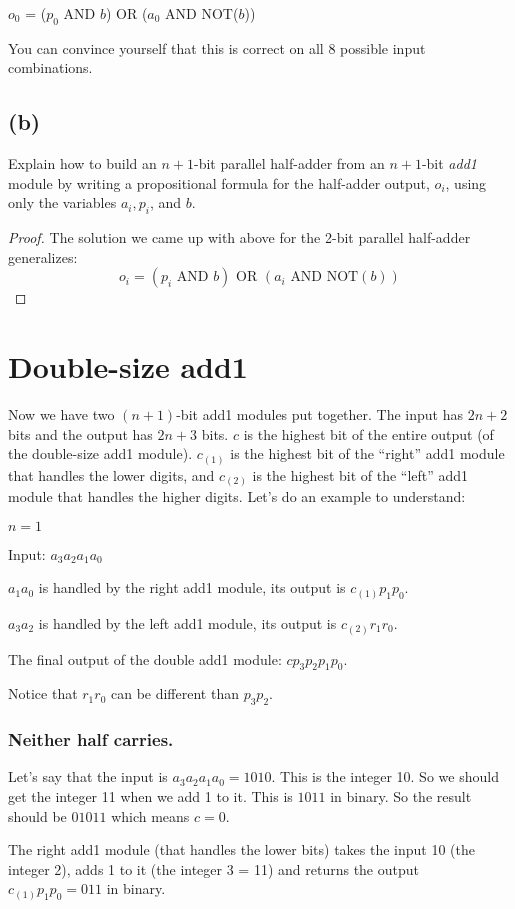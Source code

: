 \documentclass[14pt]{extarticle}
\begin{document}
$o_0$ = ($p_0$ AND $b$) OR ($a_0$ AND NOT($b$))

You can convince yourself that this is correct on all 8 possible input combinations.

\subsection{(b)}
Explain how to build an $n+1$-bit parallel half-adder from an $n+1$-bit \textit{add1} module by writing a propositional formula for the half-adder output, $o_i$, using only the variables $a_i, p_i$, and $b$.
\begin{proof}
The solution we came up with above for the 2-bit parallel half-adder generalizes:
$$
o_i = (p_i \text{ AND } b) \text{ OR } (a_i \text{ AND NOT}(b))
$$
\end{proof}
\section{Double-size add1}
Now we have two $(n+1)$-bit add1 modules put together. The input has $2n+2$ bits and the output has $2n+3$ bits. $c$ is the highest bit of the entire output (of the double-size add1 module). $c_{(1)}$ is the highest bit of the ``right'' add1 module that handles the lower digits, and $c_{(2)}$ is the highest bit of the ``left'' add1 module that handles the higher digits. Let's do an example to understand:

$n = 1$

Input: $a_3a_2a_1a_0$

$a_1a_0$ is handled by the right add1 module, its output is $c_{(1)}p_1p_0$.

$a_3a_2$ is handled by the left add1 module, its output is $c_{(2)}r_1r_0$.

The final output of the double add1 module: $cp_3p_2p_1p_0$.

Notice that $r_1r_0$ can be different than $p_3p_2$.

\subsubsection{Neither half carries.}
Let's say that the input is $a_3a_2a_1a_0 = 1010$. This is the integer 10. So we should get the integer 11 when we add 1 to it. This is $1011$ in binary. So the result should be $01011$ which means $c = 0$.

The right add1 module (that handles the lower bits) takes the input 10 (the integer 2), adds 1 to it (the integer 3 = 11) and returns the output $c_{(1)}p_1p_0 = 011$ in binary.
\end{document}
